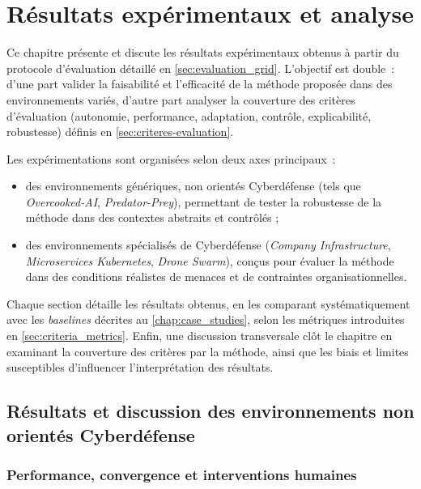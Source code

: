 \clearpage
\thispagestyle{empty}
\null
\newpage



\chapter{Résultats expérimentaux et analyse}

Ce chapitre présente et discute les résultats expérimentaux obtenus à partir du protocole d'évaluation détaillé en \autoref{sec:evaluation_grid}.
L'objectif est double~: d'une part valider la faisabilité et l'efficacité de la méthode proposée dans des environnements variés, d'autre part analyser la couverture des critères d'évaluation (autonomie, performance, adaptation, contrôle, explicabilité, robustesse) définis en \autoref{sec:criteres-evaluation}.

Les expérimentations sont organisées selon deux axes principaux~:
\begin{itemize}
  \item des environnements génériques, non orientés Cyberdéfense (tels que \textit{Overcooked-AI}, \textit{Predator-Prey}), permettant de tester la robustesse de la méthode dans des contextes abstraits et contrôlés ;
  \item des environnements spécialisés de Cyberdéfense (\textit{Company Infrastructure}, \textit{Microservices Kubernetes}, \textit{Drone Swarm}), conçus pour évaluer la méthode dans des conditions réalistes de menaces et de contraintes organisationnelles.
\end{itemize}

Chaque section détaille les résultats obtenus, en les comparant systématiquement avec les \textit{baselines} décrites au \autoref{chap:case_studies}, selon les métriques introduites en \autoref{sec:criteria_metrics}.
Enfin, une discussion transversale clôt le chapitre en examinant la couverture des critères par la méthode, ainsi que les biais et limites susceptibles d'influencer l'interprétation des résultats.

\section{Résultats et discussion des environnements non orientés Cyberdéfense}\label{sec:results_and_discussion_cyberdefense}

\subsection*{Performance, convergence et interventions humaines}

